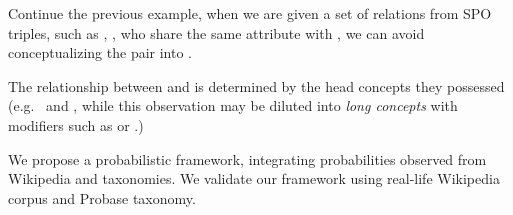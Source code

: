 \begin{example}
Continue the previous example, when we are given a set of relations from SPO triples, such as , , who share the same attribute  with , we can 
avoid conceptualizing the pair into
.
\label{exa:sd}
\end{example}

\begin{example}
The  relationship between  and  is determined by the head concepts they possessed (e.g.\  and , while this observation may be diluted into \emph{long concepts} with  modifiers such as  or .)
\label{exa:hc}
\end{example}








We propose a probabilistic framework, integrating probabilities observed
from Wikipedia and taxonomies.
We validate our framework using real-life Wikipedia corpus and Probase taxonomy.

